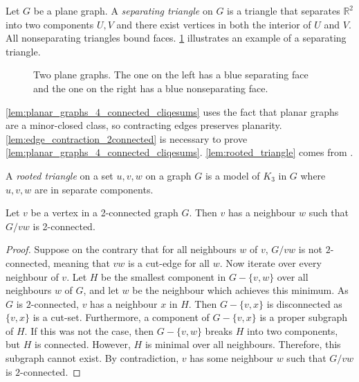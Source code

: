 Let $G$ be a plane graph. A \textit{separating triangle} on $G$ is a triangle that separates $\mathbb{R}^2$ into two components $U, V$ and there exist vertices in both the interior of $U$ and $V$. All nonseparating triangles bound faces. \cref{fig:separating_triangle} illustrates an example of a separating triangle. 
\begin{figure}[h!]
	
	\caption[Separating faces]{Two plane graphs. The one on the left has a blue separating face and the one on the right has a blue nonseparating face.}\label{fig:separating_triangle}
\end{figure}

\cref{lem:planar_graphs_4_connected_cliqesums} uses the fact that planar graphs are a minor-closed class, so contracting edges preserves planarity. \cref{lem:edge_contraction_2connected} is necessary to prove \cref{lem:planar_graphs_4_connected_cliqesums}. \cref{lem:rooted_triangle} comes from \textcite{woodThomassensChoosabilityArgument2010}.

A \textit{rooted triangle} on a set $u, v, w$ on a graph $G$ is a model of $K_3$ in $G$ where $u, v, w$ are in separate components. 

\begin{lemma}\label{lem:edge_contraction_2connected}
	Let $v$ be a vertex in a 2-connected graph $G$. Then $v$ has a neighbour $w$ such that $G/vw$ is 2-connected.
\end{lemma}
\begin{proof}
	Suppose on the contrary that for all neighbours $w$ of $v$, $G/vw$ is not $2$-connected, meaning that $vw$ is a cut-edge for all $w$. Now iterate over every neighbour of $v$. Let $H$ be the smallest component in $G - \{v,w\}$ over all neighbours $w$ of $G$, and let $w$ be the neighbour which achieves this minimum. As $G$ is $2$-connected, $v$ has a neighbour $x$ in $H$. Then $G - \{v, x\}$ is disconnected as $\{v,x\}$ is a cut-set. Furthermore, a component of $G - \{v,x\}$ is a proper subgraph of $H$. If this was not the case, then $G - \{v,w\}$ breaks $H$ into two components, but $H$ is connected. However, $H$ is minimal over all neighbours. Therefore, this subgraph cannot exist. By contradiction, $v$ has some neighbour $w$ such that $G/vw$ is $2$-connected. 
\end{proof}


